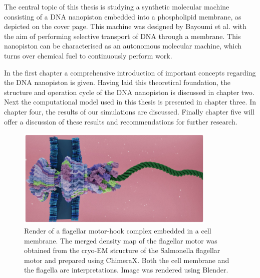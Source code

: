 The central topic of this thesis is studying a synthetic molecular machine consisting of
a DNA nanopiston embedded into a phospholipid membrane, as depicted on the cover page.
This machine was designed by Bayoumi et al. with the aim of performing
selective transport of DNA through a membrane.\cite{Bayoumi21} This
nanopiston can be characterised as an autonomous molecular machine, which turns over
chemical fuel to continuously perform work.


In the first chapter a comprehensive introduction of important concepts
regarding the DNA nanopiston is given. Having laid this theoretical foundation, the
structure and operation cycle of the DNA nanopiston is discussed in chapter two. Next the
computational model used in this thesis is presented in chapter three. In chapter four,
the results of our simulations are discussed. Finally chapter five will offer a
discussion of these results and recommendations for further research.
\vspace{0.5cm}
\begin{figure}[ht!]
\begin{center}
  \includegraphics[width=0.85\textwidth]{Figures/flagella2.png}
  \caption[Render of a flagellar motor-hook complex, based on the cryo-EM structure of
  the Salmonella flagellar motor.] {Render of a flagellar motor-hook complex embedded in
  a
  cell membrane. The merged density map of the flagellar motor was obtained from the
  cryo-EM structure of the Salmonella flagellar motor and
  prepared using
  ChimeraX.  Both the cell membrane and the flagella are interpretations. Image was
rendered using Blender.\cite{Tan2021, blender,
ChimeraX}}
  \label{fig:flagella}
\end{center}
\end{figure}

